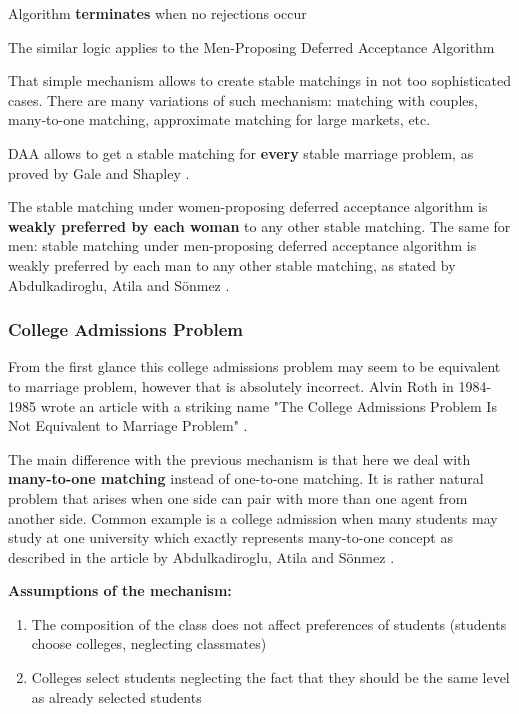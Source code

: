 \documentclass[a4paper]{article} %
\begin{document}
\hfill 
\break
Algorithm \textbf{terminates} when no rejections occur

\hfill 
\break
The similar logic applies to the Men-Proposing Deferred Acceptance Algorithm

\hfill 
\break
That simple mechanism allows to create stable matchings in not too sophisticated cases. There are many variations of such mechanism: matching with couples, many-to-one matching, approximate matching for large markets, etc.

\hfill 
\break
DAA allows to get a stable matching for \textbf{every} stable marriage problem, as proved by Gale and Shapley \cite{MilestoneWork}.

\hfill 
\break
The stable matching under women-proposing deferred acceptance algorithm is \textbf{weakly preferred by each woman} to any other stable matching. The same for men: stable matching under men-proposing deferred acceptance algorithm is weakly preferred by each man to any other stable matching, as stated by Abdulkadiroglu, Atila and Sönmez \cite{MainSource}.






\subsubsection{College Admissions Problem}
From the first glance this college admissions problem may seem to be equivalent to marriage problem, however that is absolutely incorrect. Alvin Roth in 1984-1985 wrote an article with a striking name "The College Admissions Problem Is Not Equivalent to Marriage Problem" \cite{RothCollege}.

\hfill
\break
The main difference with the previous mechanism is that here we deal with \textbf{many-to-one matching} instead of one-to-one matching. It is rather natural problem that arises when one side can pair with more than one agent from another side. Common example is a college admission when many students may study at one university which exactly represents many-to-one concept as described in the article by Abdulkadiroglu, Atila and Sönmez \cite{MainSource}.

\hfill
\break
\textbf{Assumptions of the mechanism:}
\begin{enumerate}
    \item The composition of the class does not affect preferences of students (students choose colleges, neglecting classmates)
    \item Colleges select students neglecting the fact that they should be the same level as already selected students
\end{enumerate}
\end{document}
